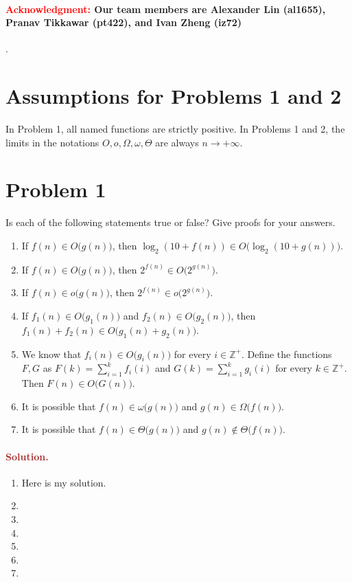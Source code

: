 \paragraph{\textcolor{red}{Acknowledgment:} Our team members are \textbf{Alexander Lin (al1655)}, \textbf{Pranav Tikkawar (pt422)}, and \textbf{Ivan Zheng (iz72)}}.

\section*{Assumptions for Problems 1 and 2}
In Problem 1, all named functions are strictly positive. In Problems 1 and 2, the limits in the notations $O, o, \Omega, \omega, \Theta$ are always $n \to +\infty$.

\section*{Problem 1}
Is each of the following statements true or false? Give proofs for your answers.
\begin{enumerate}
    \item If $f(n) \in O\big(g(n)\big)$, then $\log_2 (10 + f(n)) \in O\big(\log_2 (10 + g(n))\big)$.
    \item If $f(n) \in O\big(g(n)\big)$, then $2^{f(n)} \in O\big(2^{g(n)}\big)$.
    \item If $f(n) \in o\big(g(n)\big)$, then $2^{f(n)} \in o\big(2^{g(n)}\big)$.
    \item If $f_1(n) \in O\big(g_1(n)\big)$ and $f_2(n) \in O\big(g_2(n)\big)$, then $f_1(n) + f_2(n) \in O\big(g_1(n) + g_2(n)\big)$.
    \item We know that $f_i(n) \in O\big(g_i(n)\big)$ for every $i \in \mathbb{Z}^+$. Define the functions $F, G$ as $F(k) = \sum_{i = 1}^k f_i(i)$ and $G(k) = \sum_{i = 1}^k g_i(i)$ for every $k \in \mathbb{Z}^+$. Then $F(n) \in O\big(G(n)\big)$.
    \item It is possible that $f(n) \in \omega\big(g(n)\big)$ and $g(n) \in \Omega\big(f(n)\big)$.
    \item It is possible that $f(n) \in \Theta\big(g(n)\big)$ and $g(n) \notin \Theta\big(f(n)\big)$.
\end{enumerate}

\paragraph{\textcolor{brown}{Solution.}}
\begin{enumerate}
    \item Here is my solution.
    \item 
    \item 
    \item 
    \item
    \item 
    \item 
\end{enumerate}

